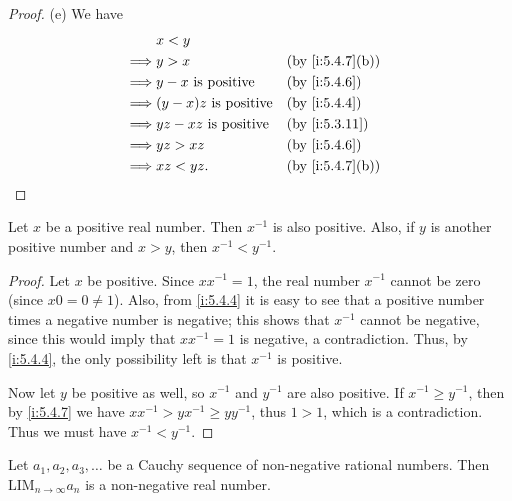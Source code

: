 \begin{proof}{(e)}
  We have
  \begin{align*}
             & x < y                                             \\
    \implies & y > x                        &  & \by{i:5.4.7}[b] \\
    \implies & y - x \text{ is positive}    &  & \by{i:5.4.6}    \\
    \implies & (y - x)z \text{ is positive} &  & \by{i:5.4.4}    \\
    \implies & yz - xz \text{ is positive}  &  & \by{i:5.3.11}   \\
    \implies & yz > xz                      &  & \by{i:5.4.6}    \\
    \implies & xz < yz.                     &  & \by{i:5.4.7}[b]
  \end{align*}
\end{proof}

\begin{prop}\label{i:5.4.8}
  Let \(x\) be a positive real number.
  Then \(x^{-1}\) is also positive.
  Also, if \(y\) is another positive number and \(x > y\), then \(x^{-1} < y^{-1}\).
\end{prop}

\begin{proof}
  Let \(x\) be positive.
  Since \(xx^{-1} = 1\), the real number \(x^{-1}\) cannot be zero (since \(x0 = 0 \neq 1\)).
  Also, from \cref{i:5.4.4} it is easy to see that a positive number times a negative number is negative;
  this shows that \(x^{-1}\) cannot be negative, since this would imply that \(xx^{-1} = 1\) is negative, a contradiction.
  Thus, by \cref{i:5.4.4}, the only possibility left is that \(x^{-1}\) is positive.

  Now let \(y\) be positive as well, so \(x^{-1}\) and \(y^{-1}\) are also positive.
  If \(x^{-1} \geq y^{-1}\), then by \cref{i:5.4.7} we have \(xx^{-1} > yx^{-1} \geq yy^{-1}\), thus \(1 > 1\), which is a contradiction.
  Thus we must have \(x^{-1} < y^{-1}\).
\end{proof}

\begin{prop}\label{i:5.4.9}
  Let \(a_1, a_2, a_3, \dots\) be a Cauchy sequence of non-negative rational numbers.
  Then \(\text{LIM}_{n \to \infty} a_n\) is a non-negative real number.
\end{prop}

